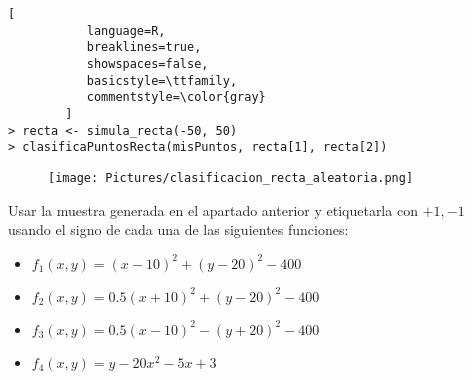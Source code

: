 \documentclass[11pt,fleqn]{book} %
\begin{document}
\begin{lstlisting}[
           language=R,
           breaklines=true,
           showspaces=false,
           basicstyle=\ttfamily,
           commentstyle=\color{gray}
        ]
> recta <- simula_recta(-50, 50)
> clasificaPuntosRecta(misPuntos, recta[1], recta[2])

\end{lstlisting}

\begin{figure}
\texttt{[image: Pictures/clasificacion\_recta\_aleatoria.png]}
\end{figure}

\begin{exercise}
Usar la muestra generada en el apartado anterior y etiquetarla con $+1, -1$ usando el signo de cada una de las siguientes funciones:\\
\begin{itemize}
\item $f_1(x,y) = (x-10)^2 + (y-20)^2 - 400$
\item $f_2(x,y) = 0.5(x+10)^2 +(y- 20)^2 - 400$
\item $f_3(x,y) = 0.5(x-10)^2 -(y + 20)^2 - 400$
\item $f_4(x,y) = y - 20x^2 - 5x+3$
\end{itemize}
\end{exercise}
\end{document}

